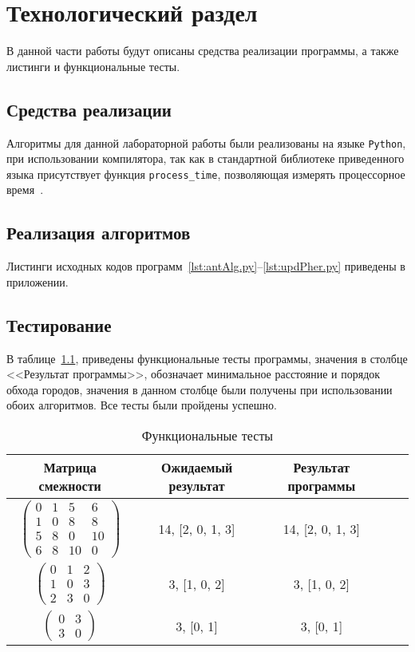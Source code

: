 \chapter{Технологический раздел}

В данной части работы будут описаны средства реализации программы, а также листинги и функциональные тесты.

\section{Средства реализации}
Алгоритмы для данной лабораторной работы были реализованы на языке \texttt{Python}, при использовании компилятора, так как в стандартной библиотеке приведенного языка
присутствует функция \texttt{process\_time}, позволяющая измерять процессорное время~\cite{process_time}.
	
	
	
\section{Реализация алгоритмов}
Листинги исходных кодов программ~\ref{lst:antAlg.py}--\ref{lst:updPher.py} приведены в приложении.
	

\section{Тестирование}
В таблице~\ref{t:func_t}, приведены функциональные тесты программы,
значения в столбце <<Результат программы>>, обозначает минимальное расстояние и порядок обхода городов, значения в данном столбце были получены при использовании обоих алгоритмов. Все тесты были пройдены успешно.
\begin{center}
	\captionsetup{justification=raggedright,singlelinecheck=off}
	\begin{longtable}[c]{|c|c|c|c|c|}
		\caption{Функциональные тесты\label{t:func_t}} \\ \hline
		Матрица смежности & Ожидаемый результат & Результат программы \\
		\hline
		$ \begin{pmatrix}
		 0 &  1  & 5 &  6\\
		1  & 0  & 8  & 8\\
		5  & 8 &  0 & 10\\
		6  & 8 & 10 &  0
		
		\end{pmatrix}$ &
		14, [2, 0, 1, 3] &
		14, [2, 0, 1, 3] \\
		
		$ \begin{pmatrix}
			0 & 1 & 2 \\
			1 & 0 & 3 \\
			2 & 3 & 0	
		\end{pmatrix}$ &
		3, [1, 0, 2] &
		3, [1, 0, 2] \\
		
		$ \begin{pmatrix}
		 0 & 3\\
		 3 & 0
		\end{pmatrix}$ &
		3, [0, 1] &
		3, [0, 1] \\
		\hline
	\end{longtable}
\end{center}
	
